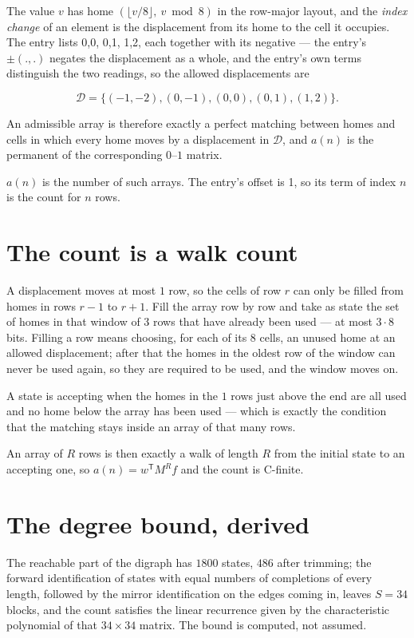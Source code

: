 \documentclass[11pt]{article}
\theoremstyle{definition}
\begin{document}
The value $v$ has home $(\lfloor v/8\rfloor,\ v \bmod 8)$ in the row-major layout, and the {\itshape index change} of an element is the displacement from its home to the cell it occupies. The entry lists 0,0, 0,1, 1,2, each together with its negative --- the entry's $\pm(.,.)$ negates the displacement as a whole, and the entry's own terms distinguish the two readings, so the allowed displacements are

\[\mathcal{D} = \{(-1,-2), (0,-1), (0,0), (0,1), (1,2)\}.\]

An admissible array is therefore exactly a perfect matching between homes and cells in which every home moves by a displacement in $\mathcal{D}$, and $a(n)$ is the permanent of the corresponding $0$--$1$ matrix.

$a(n)$ is the number of such arrays. The entry's offset is 1, so its term of index $n$ is the count for $n$ rows.

\section{The count is a walk count}

A displacement moves at most $1$ row, so the cells of row $r$ can only be filled from homes in rows $r-1$ to $r+1$. Fill the array row by row and take as state the set of homes in that window of $3$ rows that have already been used --- at most $3\cdot8$ bits. Filling a row means choosing, for each of its $8$ cells, an unused home at an allowed displacement; after that the homes in the oldest row of the window can never be used again, so they are required to be used, and the window moves on.

A state is accepting when the homes in the $1$ rows just above the end are all used and no home below the array has been used --- which is exactly the condition that the matching stays inside an array of that many rows.

An array of $R$ rows is then exactly a walk of length $R$ from the initial state to an accepting one, so $a(n) = w^{\mathsf T}M^{R}f$ and the count is C-finite.

\section{The degree bound, derived}

The reachable part of the digraph has $1800$ states, $486$ after trimming; the forward identification of states with equal numbers of completions of every length, followed by the mirror identification on the edges coming in, leaves $S = 34$ blocks, and the count satisfies the linear recurrence given by the characteristic polynomial of that $34\times34$ matrix. The bound is computed, not assumed.
\end{document}
